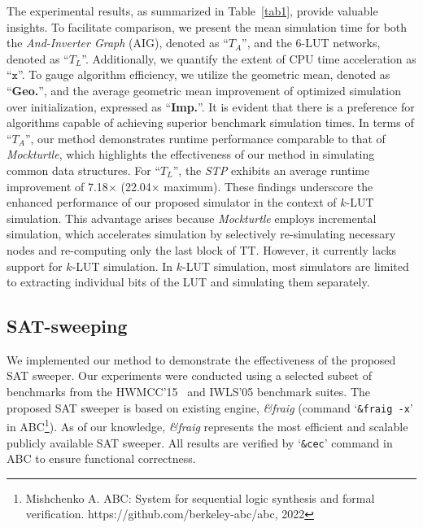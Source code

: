 \documentclass[conference]{IEEEtran}
\begin{document}
The experimental results, as summarized in Table~\ref{tab1}, provide valuable insights. 
To facilitate comparison, we present the mean simulation time for both the \emph{And-Inverter Graph} (AIG), denoted as ``$T_A$'', and the $6$-LUT networks, denoted as ``$T_L$''. 
Additionally, we quantify the extent of CPU time acceleration as ``$\texttt{x}$''.
To gauge algorithm efficiency, we utilize the geometric mean, denoted as ``{\bf Geo.}'', and the average geometric mean improvement of optimized simulation over initialization, expressed as ``{\bf Imp.}''. 
It is evident that there is a preference for algorithms capable of achieving superior benchmark simulation times.
In terms of ``$T_A$'', our method demonstrates runtime performance comparable to that of \emph{Mockturtle}, which highlights the effectiveness of our method in simulating common data structures.
For ``$T_L$'', the \emph{STP} exhibits an average runtime improvement of 7.18$\times$ (22.04$\times$ maximum). 
These findings underscore the enhanced performance of our proposed simulator in the context of $k$-LUT simulation.
This advantage arises because \emph{Mockturtle} employs incremental simulation, which accelerates simulation by selectively re-simulating necessary nodes and re-computing only the last block of TT. 
However, it currently lacks support for $k$-LUT simulation. 
In $k$-LUT simulation, most simulators are limited to extracting individual bits of the LUT and simulating them separately.

\subsection{SAT-sweeping}
\label{sec62}
We implemented our method to demonstrate the effectiveness of the proposed SAT sweeper. 
Our experiments were conducted using a selected subset of benchmarks from the HWMCC'15~\cite{exp1} and IWLS'05\cite{exp2} benchmark suites.
The proposed SAT sweeper is based on existing engine, \emph{\&fraig} (command `\texttt{\&fraig -x}' in ABC\footnote{Mishchenko A. ABC: System for sequential logic synthesis and formal verification. https://github.com/berkeley-abc/abc, 2022}). 
As of our knowledge, \emph{\&fraig} represents the most efficient and scalable publicly available SAT sweeper.
All results are veriﬁed by `\texttt{\&cec}' command in ABC to ensure functional correctness.
\end{document}
